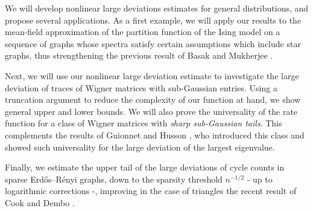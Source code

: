 \documentclass[aop,preprint]{imsart}
\numberwithin{equation}{section}
\theoremstyle{definition}
\theoremstyle{plain}
\theoremstyle{remark}
\begin{document}
We will develop nonlinear large deviations estimates for general distributions, and propose several applications.
As a first example, we will apply our results to the mean-field approximation of the partition function of the Ising model on a sequence of graphs whose spectra satisfy certain assumptions which include star graphs, thus strengthening the previous result of Basak and Mukherjee \cite{BM}. 


Next, we will use our nonlinear large deviation estimate to investigate the large deviation of traces of Wigner matrices with sub-Gaussian entries. Using a truncation argument to reduce the complexity of our function at hand, we show general upper and lower bounds. We will also prove the universality of the rate function for a class of Wigner matrices with \textit{sharp sub-Gaussian tails}. This complements the results of Guionnet and Husson  \cite{GH}, who introduced this class and showed such universality for the large deviation of the largest eigenvalue.

Finally, we estimate the upper tail of the large deviations of cycle counts in sparse  Erd\H{o}s--R\'enyi graphs, down to the sparsity threshold $n^{-1/2}$ - up to logarithmic corrections -, improving in the case of triangles the recent result of Cook and Dembo \cite{CoD}.
\end{document}
